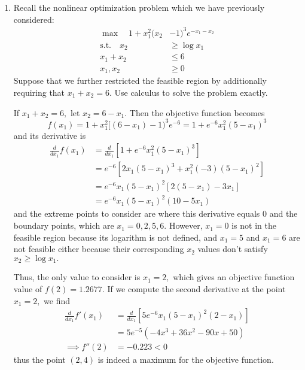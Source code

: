 \documentclass{article}
\begin{document}
\begin{enumerate}
	\item Recall the nonlinear optimization problem which we have previously considered: 
		\begin{align*}
			\max \quad 1+x_1^2(x_2&-1)^3e^{-x_1-x_2} \\
			\text{s.t.}\quad x_2&\ge\log x_1 \\
			x_1+x_2 &\le 6 \\
			x_1, x_2 &\ge 0
		\end{align*}
		Suppose that we further restricted the feasible region by additionally requiring that $x_1+x_2=6.$ Use calculus to solve the problem exactly.
		\begin{soln}
			If $x_1+x_2=6,$ let $x_2=6-x_1.$ Then the objective function becomes \[f(x_1)=1+x_1^2[(6-x_1)-1)^3e^{-6}=1+e^{-6}x_1^2(5-x_1)^3\] and its derivative is 
			\begin{align*}
				\frac{d}{dx_1}f(x_1) &= \frac{d}{dx_1}\left[ 1+e^{-6}x_1^2(5-x_1)^3 \right] \\
				&= e^{-6}\left[ 2x_1(5-x_1)^3 + x_1^2(-3)(5-x_1)^2 \right] \\
				&= e^{-6} x_1(5-x_1)^2 \left[ 2(5-x_1)-3x_1 \right] \\
				&= e^{-6}x_1(5-x_1)^2(10-5x_1)
			\end{align*} and the extreme points to consider are where this derivative equals 0 and the boundary points, which are $x_1=0, 2, 5, 6.$ However, $x_1=0$ is not in the feasible region because its logarithm is not defined, and $x_1=5$ and $x_1=6$ are not feasible either because their corresponding $x_2$ values don't satisfy $x_2\ge\log x_1.$ 
			
			Thus, the only value to consider is $x_1=2,$ which gives an objective function value of $f(2)=1.2677.$ If we compute the second derivative at the point $x_1=2,$ we find 
			\begin{align*}
				\frac{d}{dx_1}f'(x_1) &= \frac{d}{dx_1} \left[ 5e^{-6}x_1(5-x_1)^2(2-x_1) \right] \\
				&= 5e^{-5}\left( -4x^3+36x^2-90x+50 \right) \\
				\implies f''(2) &= -0.223 < 0
			\end{align*} thus the point $(2, 4)$ is indeed a maximum for the objective function.
			
		\end{soln}


\end{enumerate}
\end{document}
